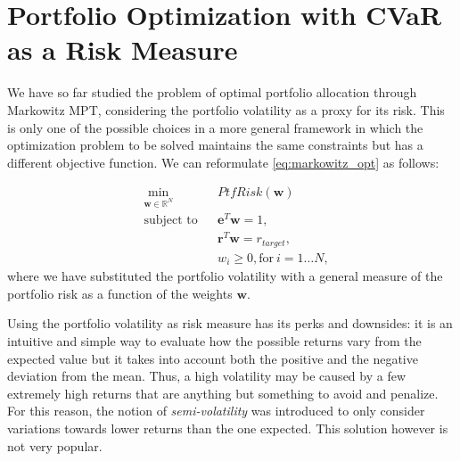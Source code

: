 \section{Portfolio Optimization with CVaR as a Risk Measure}
\label{sec:cvar_theory}

We have so far studied the problem of optimal portfolio allocation through Markowitz MPT, considering the portfolio volatility as a proxy for its risk.
This is only one of the possible choices in a more general framework in which the optimization problem to be solved maintains the same constraints but has a  different objective function. We can reformulate \eqref{eq:markowitz_opt} as follows:

\begin{subequations}
	\label{eq:general_opt}
	\begin{align}
	&\!\min_{\mathbf{w}\in \mathbb{R}^{N}}     &    & PtfRisk(\mathbf{w}) \\
	& \text{subject to}   &   & \mathbf{e}^T\mathbf{w} = 1 ,\\
	&                 &       & \mathbf{r}^T\mathbf{w} = r_{target},\label{eq:constraint2} \\
	&		   &      & w_{i} \geq 0, \text{for} \: i = 1\dots N,
	\end{align}
\end{subequations}
\noindent
where we have substituted the portfolio volatility with a general measure of the portfolio risk as a function of the weights $\mathbf{w}$.

Using the portfolio volatility as risk measure has its perks and downsides: it is an intuitive and simple way to evaluate how the possible returns vary from the expected value but it takes into account both the positive and the negative deviation from the mean. Thus, a high volatility may be caused by a few extremely high returns that are anything but something to avoid and penalize.
For this reason, the notion of \textit{semi-volatility} was introduced to only consider variations towards lower returns than the one expected. This solution however is not very popular.

